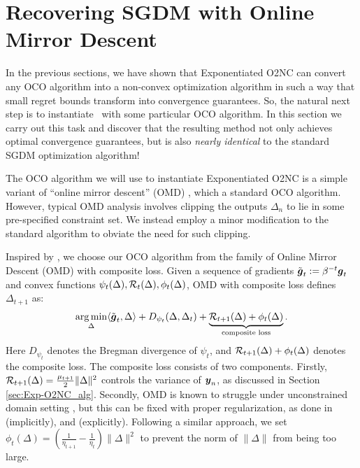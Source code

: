\section{Recovering SGDM with Online Mirror Descent}
\label{sec:Exp-O2NC_sgdm}

In the previous sections, we have shown that Exponentiated O2NC can convert any OCO algorithm into a non-convex optimization algorithm in such a way that small regret bounds transform into convergence guarantees. So, the natural next step is to instantiate \alg\ with some particular OCO algorithm. In this section we carry out this task and discover that the resulting method not only achieves optimal convergence guarantees, but is also \emph{nearly identical} to the standard SGDM optimization algorithm!

The OCO algorithm we will use to instantiate Exponentiated O2NC is a simple variant of ``online mirror descent'' (OMD) \cite{beck2003mirror}, which a standard OCO algorithm. However, typical OMD analysis involves clipping the outputs $\Delta_n$ to lie in some pre-specified constraint set. We instead employ a minor modification to the standard algorithm to obviate the need for such clipping. 

Inspired by \cite{duchi2010composite}, we choose our OCO algorithm from the family of Online Mirror Descent (OMD) with composite loss.  Given a sequence of gradients $\tilde{{\boldsymbol{g}}}_t:=\beta^{-t} {\boldsymbol{g}}_t$ and convex functions $\psi_t(\Delta), {\cal R}_t(\Delta), \phi_t(\Delta)$, OMD with composite loss defines $\Delta_{t+1}$ as:
\begin{equation*}
    \mathop{\operatorname{arg\,min}}_\Delta \langle\tilde{{\boldsymbol{g}}}_t, \Delta\rangle + D_{\psi_t}(\Delta,\Delta_t) + \underbrace{{\cal R}_{t+1}(\Delta) + \phi_t(\Delta)}_{\text{composite loss}}.
    \label{eq:Exp-O2NC:omd-update}
\end{equation*}
Here $D_{\psi_t}$ denotes the Bregman divergence of $\psi_t$, and ${\cal R}_{t+1}(\Delta)+\phi_t(\Delta)$ denotes the composite loss. 
The composite loss consists of two components. Firstly, ${\cal R}_{t+1}(\Delta)=\frac{\mu_{t+1}}{2}\|\Delta\|^2$ controls the variance of ${\boldsymbol{y}}_n$, as discussed in Section \ref{sec:Exp-O2NC_alg}. Secondly, OMD is known to struggle under unconstrained domain setting \cite{orabona2016scale}, but this can be fixed with proper regularization, as done in \citet{fang2021online} (implicitly), and \citet{jacobsen2022parameter} (explicitly). Following a similar approach, we set $\phi_t(\Delta)=(\frac{1}{\eta_{t+1}}-\frac{1}{\eta_t})\|\Delta\|^2$ to prevent the norm of $\|\Delta\|$ from being too large.

